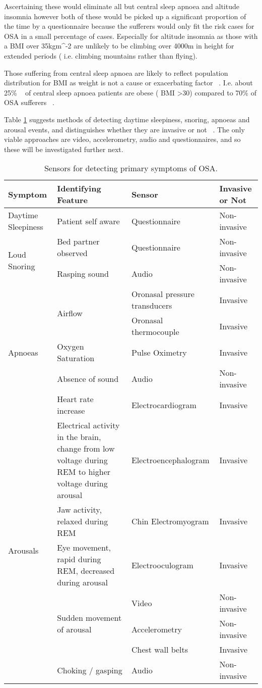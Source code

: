 Ascertaining these would eliminate all but central sleep apnoea and altitude insomnia however both of these would be picked up a significant proportion of the time by a questionnaire because the sufferers would only fit the risk cases for OSA in a small percentage of cases. Especially for altitude insomnia as those with a BMI over 35kgm^{-2} are unlikely to be climbing over 4000m in height for extended periods ( i.e. climbing mountains rather than flying).

Those suffering from central sleep apnoea are likely to reflect population distribution for BMI as weight is not a cause or exacerbating factor ~\cite{american2001international}. I.e. about 25\% ~\cite{adultobesity} of central sleep apnoea patients are obese ( BMI >30) compared to 70\% of OSA sufferers ~\cite{malhotra2002obstructive}.

Table \ref{table:X3} suggests methods of detecting daytime sleepiness, snoring, apnoeas and arousal events, and distinguishes whether they are invasive or not ~\cite{ iber2007aasm}. The only viable approaches are video, accelerometry, audio and questionnaires, and so these will be investigated further next.

\begin{table}[h]
\centering
\begin{tabular}{l l l l}
\toprule
Symptom&Identifying Feature&Sensor&Invasive or Not\\ \midrule
Daytime Sleepiness&Patient self aware&Questionnaire&Non-invasive\\ 
\multirow{2}{*}{Loud Snoring}&Bed partner observed&Questionnaire&Non-invasive\\ 
&Rasping sound&Audio&Non-invasive\\ 
\multirow{5}{*}{Apnoeas}&\multirow{2}{*}{Airflow}&Oronasal pressure transducers&Invasive\\ 
&&Oronasal thermocouple&Invasive\\ 
&Oxygen Saturation&Pulse Oximetry&Invasive\\ 
&Absence of sound&Audio&Non-invasive\\ 
&Heart rate increase&Electrocardiogram&Invasive\\ 
\multirow{7}{*}{Arousals}&Electrical activity in the brain, change from low voltage \newline during REM to higher voltage during arousal&Electroencephalogram&Invasive\\ 
&Jaw activity, relaxed during REM&Chin Electromyogram&Invasive\\ 
&Eye movement, rapid during REM, decreased during arousal&Electrooculogram&Invasive\\ 
&\multirow{3}{*}{Sudden movement of arousal}&Video&Non-invasive\\ 
&&Accelerometry&Non-invasive\\ 
&&Chest wall belts&Invasive\\ 
&Choking / gasping&Audio&Non-invasive\\ \bottomrule
\end{tabular}
\caption{Sensors for detecting primary symptoms of OSA.}
\label{table:X3}
\end{table}
